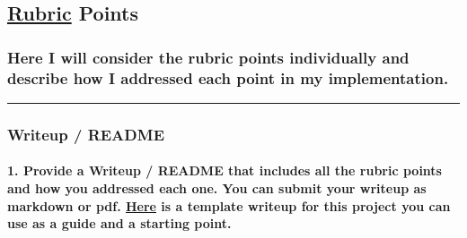 \documentclass[11pt]{article}
\begin{document}
\hypertarget{rubric-points}{%
\subsection{\texorpdfstring{\href{https://review.udacity.com/\#!/rubrics/571/view}{Rubric}
Points}{Rubric Points}}\label{rubric-points}}

\hypertarget{here-i-will-consider-the-rubric-points-individually-and-describe-how-i-addressed-each-point-in-my-implementation.}{%
\subsubsection{Here I will consider the rubric points individually and
describe how I addressed each point in my
implementation.}\label{here-i-will-consider-the-rubric-points-individually-and-describe-how-i-addressed-each-point-in-my-implementation.}}

\begin{center}\rule{0.5\linewidth}{\linethickness}\end{center}

\hypertarget{writeup-readme}{%
\subsubsection{Writeup / README}\label{writeup-readme}}

\hypertarget{provide-a-writeup-readme-that-includes-all-the-rubric-points-and-how-you-addressed-each-one.-you-can-submit-your-writeup-as-markdown-or-pdf.-here-is-a-template-writeup-for-this-project-you-can-use-as-a-guide-and-a-starting-point.}{%
\paragraph{\texorpdfstring{1. Provide a Writeup / README that includes
all the rubric points and how you addressed each one. You can submit
your writeup as markdown or pdf.
\href{https://github.com/udacity/CarND-Advanced-Lane-Lines/blob/master/writeup_template.md}{Here}
is a template writeup for this project you can use as a guide and a
starting
point.}{1. Provide a Writeup / README that includes all the rubric points and how you addressed each one. You can submit your writeup as markdown or pdf. Here is a template writeup for this project you can use as a guide and a starting point.}}\label{provide-a-writeup-readme-that-includes-all-the-rubric-points-and-how-you-addressed-each-one.-you-can-submit-your-writeup-as-markdown-or-pdf.-here-is-a-template-writeup-for-this-project-you-can-use-as-a-guide-and-a-starting-point.}}
\end{document}
